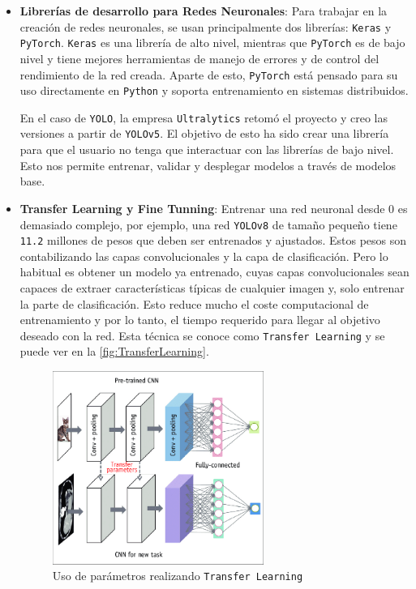 \begin{itemize}
    \item \textbf{Librerías de desarrollo para Redes Neuronales}: Para trabajar en la creación de redes neuronales, se usan principalmente dos librerías: \texttt{Keras} y \texttt{PyTorch}.
    \texttt{Keras} es una librería de alto nivel, mientras que \texttt{PyTorch} es de bajo nivel y tiene mejores herramientas de manejo de errores y de control del rendimiento de la red creada. 
    Aparte de esto, \texttt{PyTorch} está pensado para su uso directamente en \texttt{Python} y soporta entrenamiento en sistemas distribuidos.


    En el caso de \texttt{YOLO}, la empresa \texttt{Ultralytics} retomó el proyecto y creo las versiones a partir de \texttt{YOLOv5}. El objetivo de esto ha sido crear una librería para 
    que el usuario no tenga que interactuar con las librerías de bajo nivel. Esto nos permite entrenar, validar y desplegar modelos a través de modelos base.
    \item \textbf{Transfer Learning y Fine Tunning}: Entrenar una red neuronal desde 0 es demasiado complejo, por ejemplo, una red \texttt{YOLOv8} de tamaño pequeño tiene \texttt{11.2} millones de pesos que 
    deben ser entrenados y ajustados. Estos pesos son contabilizando las capas convolucionales y la capa de clasificación.\newline
    Pero lo habitual es obtener un modelo ya entrenado, cuyas capas convolucionales sean capaces de extraer características típicas de cualquier imagen y, solo entrenar la parte de clasificación. 
    Esto reduce mucho el coste computacional de entrenamiento y por lo tanto, el tiempo requerido para llegar al objetivo deseado con la red. Esta técnica se conoce como \texttt{Transfer Learning} 
    y se puede ver en la \autoref{fig:TransferLearning}.
    
    \begin{figure}[H]
        \centering
        \includegraphics[width=0.65\textwidth]{images/4/TransferLearning.png}
        \caption{Uso de parámetros realizando \texttt{Transfer Learning}\cite{doBasicsDeepLearning2020}}
        \label{fig:TransferLearning}
    \end{figure}


\end{itemize}
